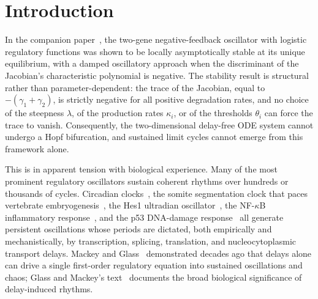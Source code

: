 \documentclass[sn-mathphys,Numbered]{sn-jnl}
\theoremstyle{thmstyleone}
\theoremstyle{thmstyletwo}
\theoremstyle{thmstylethree}
\begin{document}


\maketitle

\section{Introduction}
\label{sec:intro}

In the companion paper~\cite{belgacem2026logistic}, the two-gene
negative-feedback oscillator with logistic regulatory functions was shown to
be locally asymptotically stable at its unique equilibrium, with a damped
oscillatory approach when the discriminant of the Jacobian's characteristic
polynomial is negative. The stability result is structural rather than
parameter-dependent: the trace of the Jacobian, equal to
$-(\gamma_1+\gamma_2)$, is strictly negative for all positive degradation
rates, and no choice of the steepness $\lambda$, of the production rates
$\kappa_i$, or of the thresholds $\theta_i$ can force the trace to vanish.
Consequently, the two-dimensional delay-free ODE system cannot undergo a
Hopf bifurcation, and sustained limit cycles cannot emerge from this
framework alone.

This is in apparent tension with biological experience. Many of the most
prominent regulatory oscillators sustain coherent rhythms over hundreds or
thousands of cycles. Circadian clocks~\cite{hardin1990feedback,dunlap2004chronobiology},
the somite segmentation clock that paces vertebrate
embryogenesis~\cite{lewis2003auto,hirata2002oscillatory}, the Hes1 ultradian
oscillator~\cite{hirata2002oscillatory,monk2003oscillatory}, the NF-$\kappa$B
inflammatory response~\cite{hoffmann2002ikappab,nelson2004oscillations}, and
the p53 DNA-damage response~\cite{gevazatorsky2006oscillations} all generate persistent
oscillations whose periods are dictated, both empirically and mechanistically,
by transcription, splicing, translation, and nucleocytoplasmic transport
delays. Mackey and Glass~\cite{mackey1977oscillation} demonstrated decades
ago that delays alone can drive a single first-order regulatory equation into
sustained oscillations and chaos; Glass and Mackey's text~\cite{glass1988rhythms}
documents the broad biological significance of delay-induced rhythms.
\end{document}
